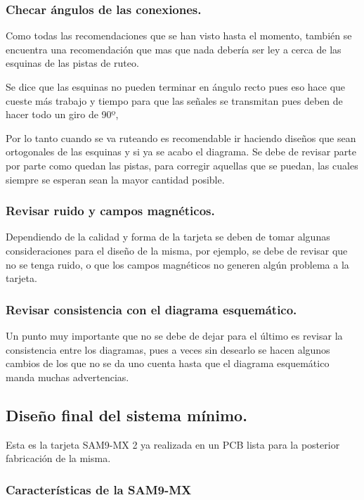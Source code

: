 \subsubsection*{Checar \'angulos de las conexiones.}

Como todas las recomendaciones que se han visto hasta el momento, también se encuentra una recomendación que mas que nada debería ser ley a cerca de las esquinas de las pistas de ruteo.

Se dice que las esquinas no pueden terminar en ángulo recto pues eso hace que cueste más trabajo y tiempo para que las señales se transmitan pues deben de hacer todo un giro de 90º,

Por lo tanto cuando se va ruteando es recomendable ir haciendo diseños que sean ortogonales de las esquinas y si ya se acabo el diagrama. Se debe de revisar parte por parte como quedan las pistas, para corregir aquellas que se puedan, las cuales siempre se esperan sean la mayor cantidad posible.

\subsubsection*{Revisar ruido y campos magn\'eticos.}

Dependiendo de la calidad y forma de la tarjeta se deben de tomar algunas consideraciones para el diseño de la misma, por ejemplo, se debe de revisar que no se tenga ruido, o que los campos magnéticos no generen algún problema a la tarjeta.


\subsubsection*{Revisar consistencia con el diagrama esquemático.}

Un punto muy importante que no se debe de dejar para el último es revisar la consistencia entre los diagramas, pues a veces sin desearlo se hacen algunos cambios de los que no se da uno cuenta hasta que el diagrama esquemático manda muchas advertencias. 

\subsection{Diseño final del sistema m\'inimo.}

Esta es la tarjeta SAM9-MX 2 ya realizada en un PCB lista para la posterior fabricación de la misma.

\subsubsection*{Caracter\'isticas de la SAM9-MX}


